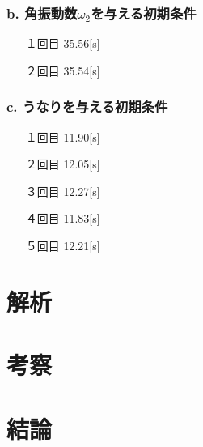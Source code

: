 \documentclass[uplatex,11pt]{jsarticle}
\begin{document}
\subsubsection*{b. 角振動数$\omega_2$を与える初期条件}
\begin{itemize}
    \item[１回目] 35.56[s]
    \item[２回目] 35.54[s]
\end{itemize}

\subsubsection*{c. うなりを与える初期条件}
\begin{itemize}
    \item[１回目] 11.90[s]
    \item[２回目] 12.05[s]
    \item[３回目] 12.27[s]
    \item[４回目] 11.83[s]
    \item[５回目] 12.21[s]
\end{itemize}

\section{解析}
\section{考察}
\section{結論}
\end{document}

